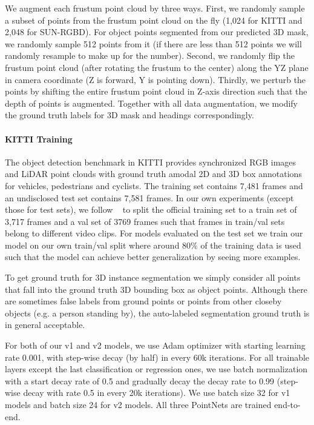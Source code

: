 \documentclass[10pt,twocolumn,letterpaper]{article}
\begin{document}
We augment each frustum point cloud by three ways. First, we randomly sample a subset of points from the frustum point cloud on the fly (1,024 for KITTI and 2,048 for SUN-RGBD). For object points segmented from our predicted 3D mask, we randomly sample 512 points from it (if there are less than 512 points we will randomly resample to make up for the number). Second, we randomly flip the frustum point cloud (after rotating the frustum to the center) along the YZ plane in camera coordinate (Z is forward, Y is pointing down). Thirdly, we perturb the points by shifting the entire frustum point cloud in Z-axis direction such that the depth of points is augmented. Together with all data augmentation, we modify the ground truth labels for 3D mask and headings correspondingly. 

\paragraph{KITTI Training} The object detection benchmark in KITTI provides synchronized RGB images and LiDAR point clouds with ground truth amodal 2D and 3D box annotations for vehicles, pedestrians and cyclists. The training set contains 7,481 frames and an undisclosed test set contains 7,581 frames. In our own experiments (except those for test sets), we follow ~\cite{chen2016monocular,cvpr17chen} to split the official training set to a train set of 3,717 frames and a val set of 3769 frames such that frames in train/val sets belong to different video clips. For models evaluated on the test set we train our model on our own train/val split where around 80\% of the training data is used such that the model can achieve better generalization by seeing more examples.

To get ground truth for 3D instance segmentation we simply consider all points that fall into the ground truth 3D bounding box as object points. Although there are sometimes false labels from ground points or points from other closeby objects (e.g. a person standing by), the auto-labeled segmentation ground truth is in general acceptable.

For both of our v1 and v2 models, we use Adam optimizer with starting learning rate 0.001, with step-wise decay (by half) in every 60k iterations. For all trainable layers except the last classification or regression ones, we use batch normalization with a start decay rate of 0.5 and gradually decay the decay rate to 0.99 (step-wise decay with rate 0.5 in every 20k iterations). We use batch size 32 for v1 models and batch size 24 for v2 models. All three PointNets are trained end-to-end.
\end{document}
